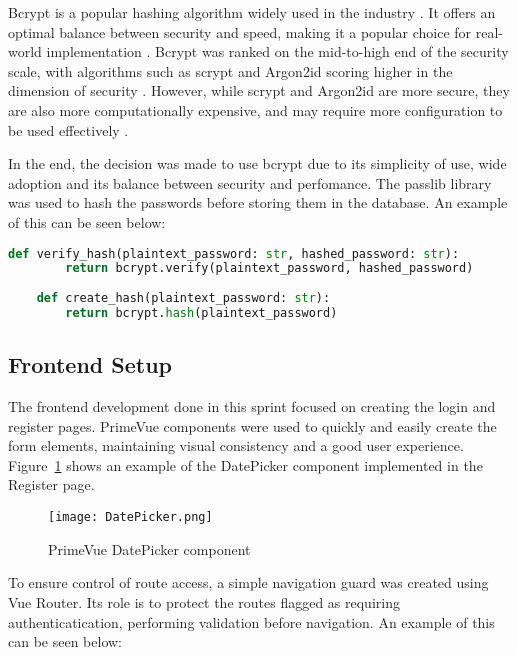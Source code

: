 Bcrypt is a popular hashing algorithm widely used in the industry \parencite{hash3, hash2}. It offers an optimal balance between security and speed, making it a popular choice for real-world implementation \parencite{hash1}. Bcrypt was ranked on the mid-to-high end of the security scale, with algorithms such as scrypt and Argon2id scoring higher in the dimension of security \parencite{hash1, hash3}. However, while scrypt and Argon2id are more secure, they are also more computationally expensive, and may require more configuration to be used effectively \parencite{hash1}. 

In the end, the decision was made to use bcrypt due to its simplicity of use, wide adoption and its balance between security and perfomance. The passlib library was used to hash the passwords before storing them in the database. An example of this can be seen below:

\begin{lstlisting}[language=Python, caption=Hashing passwords with bcrypt]
    def verify_hash(plaintext_password: str, hashed_password: str):
        return bcrypt.verify(plaintext_password, hashed_password)
    
    def create_hash(plaintext_password: str):
        return bcrypt.hash(plaintext_password)
\end{lstlisting}

\subsection{Frontend Setup}

The frontend development done in this sprint focused on creating the login and register pages. PrimeVue components were used to quickly and easily create the form elements, maintaining visual consistency and a good user experience. Figure~\ref{fig:datepicker} shows an example of the DatePicker component implemented in the Register page.

\begin{figure}[htbp]
  \centering
  \texttt{[image: DatePicker.png]}
  \caption{PrimeVue DatePicker component}\label{fig:datepicker}
\end{figure}

\FloatBarrier{}

To ensure control of route access, a simple navigation guard was created using Vue Router. Its role is to protect the routes flagged as requiring authenticatication, performing validation before navigation. An example of this can be seen below:

